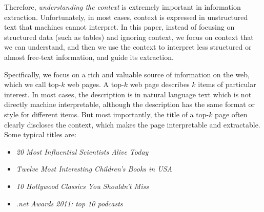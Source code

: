 

Therefore, {\it understanding the context} is extremely
important in information extraction.  Unfortunately, in most cases,
context is expressed in unstructured text that machines cannot
interpret. In this paper, instead of focusing on structured data (such
as tables) and ignoring context, we focus on context that we can
understand, and then we use the context to interpret less structured
or almost free-text information, and guide its extraction.


Specifically, we focus on a rich and valuable source of information on
the web, which we call top-$k$ web pages. A top-$k$ web page describes
$k$ items of particular interest.  In most cases, the description is
in natural language text which is not directly machine interpretable,
although the description has the same format or style for different
items. But most importantly, the title of a top-$k$ page often clearly
discloses the context, which makes the page interpretable and
extractable. Some typical titles are:

\begin{itemize}
\item {\it 20 Most Influential Scientists Alive Today}
\item {\it Twelve Most Interesting Children's Books in USA}
\item {\it 10 Hollywood Classics You Shouldn't Miss}
\item {\it .net Awards 2011: top 10 podcasts}
\end{itemize}

